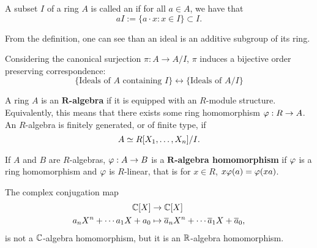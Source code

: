 \documentclass{ximera}
\begin{document}
\begin{definition} A subset $I$ of a ring $A$ is called an  if for all $a\in A$, we have that
\[
aI := \{a\cdot x: x\in I\} \subset I.
\]
\end{definition}
From the definition, one can see than an ideal is an additive subgroup of its ring.



\begin{theorem}\label{T:corr}
  Considering the canonical surjection $\pi:A \to A/I$, $\pi$ induces
  a bijective order preserving correspondence:
  \[
  \{\text{Ideals of $A$ containing $I$}\} \longleftrightarrow \{\text{Ideals of $A/I$}\} 
  \]
\end{theorem}








\begin{definition}
  A ring $A$ is an \textbf{$\boldsymbol{R}$-algebra} if it is equipped
  with an $R$-module structure. Equivalently, this means that there
  exists some ring homomorphism $\varphi:R\to A$. An $R$-algebra is
  finitely generated, or of finite type, if
  \[
  A \simeq R[X_1,\dots,X_n]/I.
  \]
\end{definition}

\begin{definition}
  If $A$ and $B$ are $R$-algebras, $\varphi:A\to B$ is a
  \textbf{$\boldsymbol{R}$-algebra homomorphism} if $\varphi$ is a ring
  homomorphism and $\varphi$ is $R$-linear, that is for $x\in R$, $x\varphi(a)
  = \varphi(xa)$.
\end{definition}


\begin{example} The complex conjugation map
\begin{align*}
\mathbb C[X] &\to \mathbb C[X]\\
a_nX^n + \cdots a_1X + a_0 &\mapsto \overline{a}_nX^n + \cdots \overline{a}_1X + \overline{a}_0, 
\end{align*}
is not a $\mathbb C$-algebra homomorphism, but it is an $\mathbb R$-algebra homomorphism.
\end{example}
\end{document}
